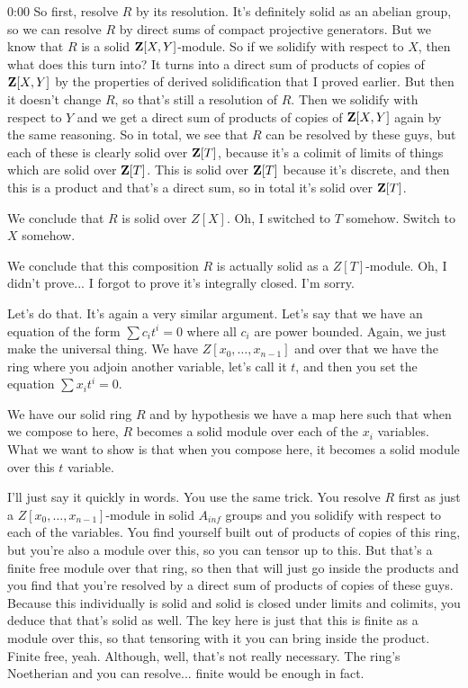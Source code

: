 \begin{unfinished}{0:00}
So first, resolve $R$ by its resolution. It's definitely solid as an abelian group, so we can resolve $R$ by direct sums of compact projective generators. But we know that $R$ is a solid $\mathbf Z[X,Y]$-module. So if we solidify with respect to $X$, then what does this turn into? It turns into a direct sum of products of copies of $\mathbf Z[X,Y]$ by the properties of derived solidification that I proved earlier. But then it doesn't change $R$, so that's still a resolution of $R$. Then we solidify with respect to $Y$ and we get a direct sum of products of copies of $\mathbf Z[X,Y]$ again by the same reasoning. So in total, we see that $R$ can be resolved by these guys, but each of these is clearly solid over $\mathbf Z[T]$, because it's a colimit of limits of things which are solid over $\mathbf Z[T]$. This is solid over $\mathbf Z[T]$ because it's discrete, and then this is a product and that's a direct sum, so in total it's solid over $\mathbf Z[T]$.

We conclude that $R$ is solid over $Z[X]$. Oh, I switched to $T$ somehow. Switch to $X$ somehow.

We conclude that this composition $R$ is actually solid as a $Z[T]$-module. Oh, I didn't prove... I forgot to prove it's integrally closed. I'm sorry.

Let's do that. It's again a very similar argument. Let's say that we have an equation of the form $\sum c_i t^i = 0$ where all $c_i$ are power bounded. Again, we just make the universal thing. We have $Z[x_0, \dots, x_{n-1}]$ and over that we have the ring where you adjoin another variable, let's call it $t$, and then you set the equation $\sum x_i t^i = 0$.

We have our solid ring $R$ and by hypothesis we have a map here such that when we compose to here, $R$ becomes a solid module over each of the $x_i$ variables. What we want to show is that when you compose here, it becomes a solid module over this $t$ variable.

I'll just say it quickly in words. You use the same trick. You resolve $R$ first as just a $Z[x_0, \dots, x_{n-1}]$-module in solid $A_{inf}$ groups and you solidify with respect to each of the variables. You find yourself built out of products of copies of this ring, but you're also a module over this, so you can tensor up to this. But that's a finite free module over that ring, so then that will just go inside the products and you find that you're resolved by a direct sum of products of copies of these guys. Because this individually is solid and solid is closed under limits and colimits, you deduce that that's solid as well. The key here is just that this is finite as a module over this, so that tensoring with it you can bring inside the product. Finite free, yeah. Although, well, that's not really necessary. The ring's Noetherian and you can resolve... finite would be enough in fact.


\end{unfinished}

